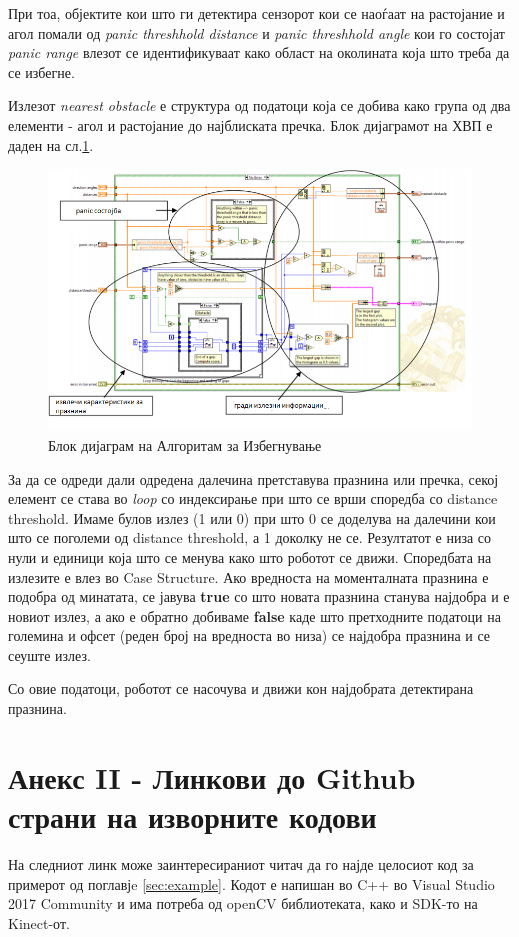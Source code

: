 \documentclass[12pt]{article}
\begin{document}
  При тоа, објектите кои што ги детектира сензорот кои се наоѓаат на растојание и агол помали од \textit{panic threshhold distance} и \textit{panic threshhold angle} кои го состојат \textit{panic range} влезот се идентификуваат како област на околината која што треба да се избегне.

  Излезот \textit{nearest obstacle} е структура од податоци која се добива како група од два елементи - агол и растојание до најблиската пречка. Блок дијаграмот на ХВП е даден на сл.\ref{fig:vfh_block_diagram.png}.

  \begin{figure}[H]
    \includegraphics[width=0.75\linewidth]{vfh_block_diagram.png}
    \centering
    \caption{Блок дијаграм на Алгоритам за Избегнување}
    \label{fig:vfh_block_diagram.png}
    \end{figure}

  За да се одреди дали одредена далечина претставува празнина или пречка, секој елемент се става во \textit{loop} со индексирање при што се врши споредба со distance threshold. Имаме булов излез (1 или 0) при што 0 се доделува на далечини кои што се поголеми од distance threshold, а 1 доколку не се. Резултатот е низа со нули и единици која што се менува како што роботот се движи. Споредбата на излезите е влез во Case Structure. Ако вредноста на моменталната празнина е подобра од минатата, се јавува \textbf{true} со што новата празнина станува најдобра и е новиот излез, а ако е обратно добиваме \textbf{false} каде што претходните податоци на големина и офсет (реден број на вредноста во низа) се најдобра празнина и се сеуште излез.

  Со овие податоци, роботот се насочува и движи кон најдобрата детектирана празнина.
\newpage
\section{Анекс II - Линкови до Github страни на изворните кодови}
    На следниот линк може заинтересираниот читач да го најде целосиот код за примерот од поглавјe \ref{sec:example}. Кодот е напишан во C++ во Visual Studio 2017 Community и има потреба од openCV библиотеката, како и SDK-то на Kinect-от.
\end{document}
